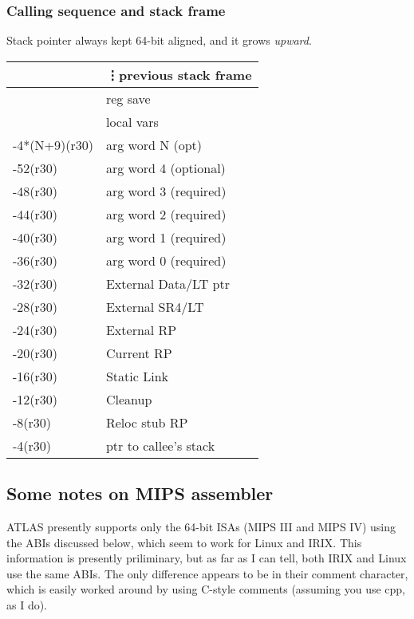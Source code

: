 \documentclass[11pt]{article}
\begin{document}
\subsubsection{Calling sequence and stack frame}
Stack pointer always kept 64-bit aligned, and it grows {\em upward}.
\begin{center}
\begin{tabular}{l|l}
              & \vdots previous stack frame \\\hline
              & reg save \\\hline
              & local vars \\\hline
-4*(N+9)(r30) & arg word N (opt) \\\hline
-52(r30) & arg word 4 (optional) \\\hline
-48(r30) & arg word 3 (required) \\\hline
-44(r30) & arg word 2 (required) \\\hline
-40(r30) & arg word 1 (required) \\\hline
-36(r30) & arg word 0 (required) \\\hline
-32(r30) & External Data/LT ptr\\\hline
-28(r30) & External SR4/LT\\\hline
-24(r30) & External RP\\\hline
-20(r30) & Current RP\\\hline
-16(r30) & Static Link\\\hline
-12(r30) & Cleanup\\\hline
 -8(r30) & Reloc stub RP\\\hline
 -4(r30) & ptr to callee's stack \\\hline
\end{tabular}
\end{center}

\clearpage
\subsection{Some notes on MIPS assembler}
ATLAS presently supports only the 64-bit ISAs (MIPS III and  MIPS IV)
using the ABIs discussed below, which seem to work for Linux and IRIX.
This information is presently priliminary, but as far as I can tell,
both IRIX and Linux use the same ABIs.  The only difference appears to
be in their comment character, which is easily worked around by using
C-style comments (assuming you use cpp, as I do).  
\end{document}
